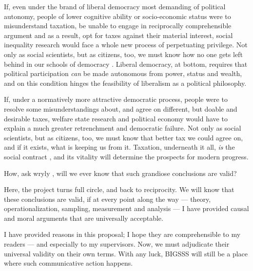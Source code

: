 If, even under the brand of liberal democracy most demanding of political autonomy, people of lower cognitive ability or socio-economic status were to misunderstand taxation, be unable to engage in reciprocally comprehensible argument and as a result, opt for taxes against their material interest, social inequality research would face a whole new process of perpetuating privilege.
Not only as social scientists, but as citizens, too, we must know how no one gets left behind in our schools of democracy \citep{DeTocqueville1840,Rosenberg-2002-aa}.
Liberal democracy, at bottom, requires that political participation \emph{can} be made autonomous from power, status and wealth, and on this condition hinges the feasibility of liberalism as a political philosophy.

If, under a normatively more attractive democratic process, people were to resolve some misunderstandings about, and agree on different, but doable and desirable taxes, welfare state research and political economy would have to explain a much greater retrenchment and democratic failure.
Not only as social scientists, but as citizens, too, we must know that better tax we could agree on, and if it exists, what is keeping us from it.
Taxation, underneath it all, \emph{is} the social contract \citep{SchumpeterSwedberg-1942-aa}, and its vitality will determine the prospects for modern progress.

How, ask wryly \cite[2]{PrzeworskiSalomon1995}, will we ever know that such grandiose conclusions are valid?

Here, the project turns full circle, and back to reciprocity.
We will know that these conclusions are valid, if at every point along the way --- theory, operationalization, sampling, measurement and analysis --- I have provided causal and moral arguments that are universally acceptable.

I have provided reasons in this proposal; I hope they are comprehensible to my readers --- and especially to my supervisors.
Now, we must adjudicate their universal validity on their own terms.
With any luck, \gls{BIGSSS} will still be a place where such communicative action happens.